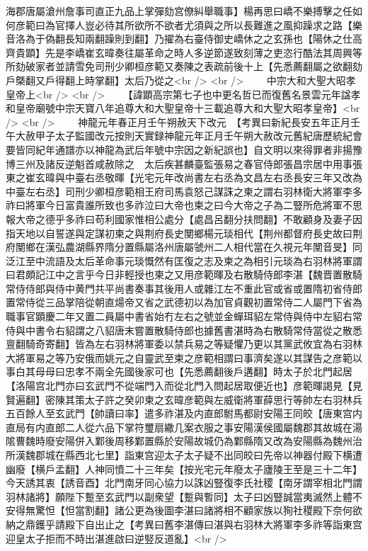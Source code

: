 海郡唐屬滄州詹事司直正九品上掌彈劾宫僚糾舉職事】楊再思曰嶠不樂搏擊之任如何彦範曰為官擇人豈必待其所欲所不欲者尤須與之所以長難進之風抑躁求之路【樂音洛為于偽翻長知兩翻躁則到翻】乃擢為右臺侍御史嶠休之之玄孫也【陽休之仕高齊貴顕】先是李嶠崔玄暐奏往屬革命之時人多逆節遂致刻薄之吏恣行酷法其周興等所劾破家者並請雪免司刑少卿桓彦範又奏陳之表疏前後十上【先悉薦翻屬之欲翻劾戶槩翻又戶得翻上時掌翻】太后乃從之<br />
<br />
　　中宗大和大聖大昭孝皇帝上<br />
<br />
　　【諱顕高宗第七子也中更名哲已而復舊名景雲元年諡孝和皇帝廟號中宗天寶八年追尊大和大聖皇帝十三載追尊大和大聖大昭孝皇帝】<br />
<br />
　　神龍元年春正月壬午朔赦天下改元　【考異曰新紀長安五年正月壬午大赦甲子太子監國改元按則天實録神龍元年正月壬午朔大赦改元舊紀唐歷統紀會要皆同紀年通譜亦以神龍為武后年號中宗因之新紀誤也】自文明以來得罪者非揚豫博三州及諸反逆魁首咸赦除之　太后疾甚麟臺監張易之春官侍郎張昌宗居中用事張東之崔玄暐與中臺右丞敬暉【光宅元年改尚書左右丞為文昌左右丞長安三年又改為中臺左右丞】司刑少卿桓彦範相王府司馬袁怒己謀誅之柬之謂右羽林衛大將軍李多祚曰將軍今日富貴誰所致也多祚泣曰大帝也柬之曰今大帝之子為二豎所危將軍不思報大帝之德乎多祚曰苟利國家惟相公處分【處昌呂翻分扶問翻】不敢顧身及妻子因指天地以自誓遂與定謀初柬之與荆府長史閺鄉楊元琰相代【荆州都督府長史故曰荆府閺鄉在漢弘農湖縣界隋分置縣屬洛州唐屬虢州二人相代當在久視元年閺音旻】同泛江至中流語及太后革命事元琰慨然有匡復之志及柬之為相引元琰為右羽林將軍謂曰君頗記江中之言乎今日非輕授也柬之又用彦範暉及右散騎侍郎李湛【魏晋置散騎常侍侍郎與侍中黄門共平尚書奏事其後用人或雜江左不重此官或省或置隋初省侍郎置常侍從三品掌陪從朝直煬帝又省之武德初以為加官貞觀初置常侍二人屬門下省為職事官顕慶二年又置二員屬中書省始冇左右之號並金蟬珥貂左常侍與侍中左貂右常侍與中書令右貂謂之八貂唐末嘗置散騎侍郎也據舊書湛時為右散騎常侍當從之散悉亶翻騎奇寄翻】皆為左右羽林將軍委以禁兵易之等疑懼乃更以其黨武攸宜為右羽林大將軍易之等乃安俄而姚元之自靈武至柬之彦範相謂曰事濟矣遂以其謀告之彦範以事白其母母曰忠孝不兩全先國後家可也【先悉薦翻後戶遘翻】時太子於北門起居【洛陽宫北門亦曰玄武門不從端門入而從北門入問起居取便近也】彦範暉謁見【見賢遍翻】密陳其策太子許之癸卯柬之玄暐彦範與左威衛將軍薛思行等帥左右羽林兵五百餘人至玄武門【帥讀曰率】遣多祚湛及内直郎駙馬都尉安陽王同皎【唐東宫内直局有内直郎二人從六品下掌符璽扇繖几案衣服之事安陽漢侯國屬魏郡其故城在湯隂曹魏時廢安陽併入鄴後周移鄴置縣於安陽故城仍為鄴縣隋又改為安陽縣為魏州治所漢魏郡城在縣西北七里】詣東宫迎太子太子疑不出同皎曰先帝以神器付殿下横遭幽廢【横戶孟翻】人神同憤二十三年矣【按光宅元年廢太子廬陵王至是三十二年】今天誘其衷【誘音酉】北門南牙同心協力以誅凶豎復李氏社稷【南牙謂宰相北門謂羽林諸將】願陛下蹔至玄武門以副衆望【蹔與暫同】太子曰凶豎誠當夷滅然上體不安得無驚怛【怛當割翻】諸公更為後圖李湛曰諸將相不顧家族以狥社稷殿下奈何欲納之鼎鑊乎請殿下自出止之【考異曰舊李湛傳曰湛與右羽林大將軍李多祚等詣東宫迎皇太子拒而不時出湛進啟曰逆竪反道亂】<br />
